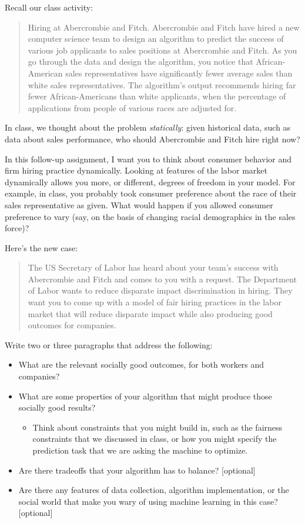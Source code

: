 \documentclass[submit]{harvardml}
\begin{document}
\newpage
\begin{problem}
Recall our class activity:
\begin{quote}
Hiring at Abercrombie and Fitch. Abercrombie and Fitch have hired a new computer science team to design an algorithm to predict the success of various job applicants to sales positions at Abercrombie and Fitch. As you go through the data and design the algorithm, you notice that African-American sales representatives have significantly fewer average sales than white sales representatives. The algorithm's output recommends hiring far fewer African-Americans than white applicants, when the percentage of applications from people of various races are adjusted for.   
\end{quote}

In class, we thought about the problem \textit{statically}: given historical data, such as data about sales performance, who should Abercrombie and Fitch hire right now? 

In this follow-up assignment, I want you to think about consumer behavior and firm hiring practice dynamically. Looking at features of the labor market dynamically allows you more, or different, degrees of freedom in your model. For example, in class, you probably took consumer preference about the race of their sales representative as given. What would happen if you allowed consumer preference to vary (say, on the basis of changing racial demographics in the sales force)?  

Here’s the new case:
\begin{quote}
The US Secretary of Labor has heard about your team's success with Abercrombie and Fitch and comes to you with a request. The Department of Labor wants to reduce disparate impact discrimination in hiring. They want you to come up with a model of fair hiring practices in the labor market that will reduce disparate impact while also producing good outcomes for companies. 
\end{quote}
Write two or three paragraphs that address the following:
\begin{itemize}
\item What are the relevant socially good outcomes, for both workers and companies?
\item What are some properties of your algorithm that might produce those socially good results?
\begin{itemize}
\item Think about constraints that you might build in, such as the fairness constraints that we discussed in class, or how you might specify the prediction task that we are asking the machine to optimize. 
\end{itemize}
\item Are there tradeoffs that your algorithm has to balance? [optional] 
\item Are there any features of data collection, algorithm implementation, or the social world that make you wary of using machine learning in this case? [optional]
\end{itemize}


\end{problem}
\end{document}
